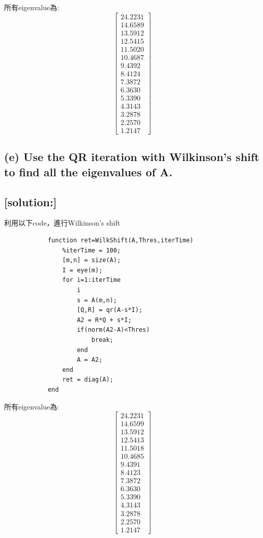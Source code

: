 \documentclass[12pt]{article}
\begin{document}
        所有eigenvalue為:\[\left[
            \begin{array}{c}
                24.2231\\
                14.6589\\
                13.5912\\
                12.5415\\
                11.5020\\
                10.4687\\
                9.4392\\
                8.4124\\
                7.3872\\
                6.3630\\
                5.3390\\
                4.3143\\
                3.2878\\
                2.2570\\
                1.2147
            \end{array}
        \right]\]
        \subsection*{(e) Use the QR iteration with Wilkinson’s shift to find all the eigenvalues of A.}
        \subsection*{[solution:]}
        利用以下code，進行Wilkinson's shift
        \begin{lstlisting}
            function ret=WilkShift(A,Thres,iterTime)
                %iterTime = 100;
                [m,n] = size(A);
                I = eye(m);
                for i=1:iterTime
                    i
                    s = A(m,n);
                    [Q,R] = qr(A-s*I);
                    A2 = R*Q + s*I;
                    if(norm(A2-A)<Thres)
                        break;
                    end
                    A = A2;
                end
                ret = diag(A);
            end
        \end{lstlisting}
        所有eigenvalue為:\[\left[
            \begin{array}{c}
                24.2231\\
                14.6599\\
                13.5912\\
                12.5413\\
                11.5018\\
                10.4685\\
                9.4391\\
                8.4123\\
                7.3872\\
                6.3630\\
                5.3390\\
                4.3143\\
                3.2878\\
                2.2570\\
                1.2147
            \end{array}
        \right]\]
\end{document}
